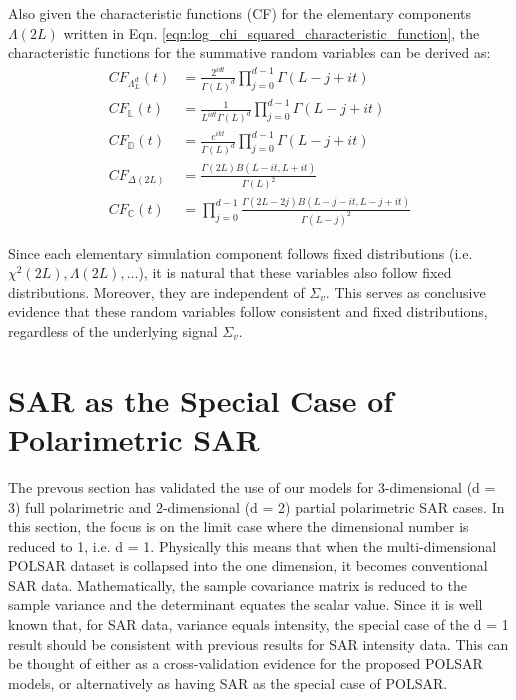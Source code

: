 Also given the characteristic functions (CF) for the elementary components $\Lambda(2L)$ written in Eqn. \ref{eqn:log_chi_squared_characteristic_function}, 
  the characteristic functions for the summative random variables can be derived as:
\begin{align}
  CF_{\Lambda^d_L}(t) &= \frac{2^{idt}}{\Gamma(L)^d} \prod^{d-1}_{j=0} \Gamma(L-j+it) \\
  CF_{\mathbb{L}}(t) &= \frac{1}{L^{idt} \Gamma(L)^d} \prod^{d-1}_{j=0} \Gamma(L-j+it) \\
  CF_{\mathbb{D}}(t) &= \frac{e^{ikt}}{\Gamma(L)^d} \prod^{d-1}_{j=0} \Gamma(L-j+it) \\
  CF_{\Delta(2L)} &= \frac{\Gamma(2L) B(L-it,L+it)}{\Gamma(L)^2} \\
  CF_{\mathbb{C}}(t) &=  \prod^{d-1}_{j=0} \frac{\Gamma(2L-2j) B(L-j-it,L-j+it)}{\Gamma(L-j)^2}
\end{align}

Since each elementary simulation component follows fixed distributions (i.e. $\chi^2(2L), \Lambda(2L), ... $),
  it is natural that these variables also follow fixed distributions.
Moreover, they are independent of $\Sigma_v$.
This serves as conclusive evidence that
  these random variables follow consistent and fixed distributions,
  regardless of the underlying signal $\Sigma_v$.

\section{SAR as the Special Case of Polarimetric SAR}
\label{sec:sar_special_case_of_polsar}

The prevous section has validated the use of our models for 3-dimensional (d = 3)
full polarimetric and 2-dimensional (d = 2) partial polarimetric SAR cases. In this
section, the focus is on the limit case where the dimensional number is reduced to 1,
i.e. d = 1. Physically this means that when the multi-dimensional POLSAR dataset is collapsed
into the one dimension, it becomes conventional  SAR data. Mathematically, the sample covariance
matrix is reduced to the sample variance and the determinant equates the scalar value.
Since  it is well known that, for SAR data, variance equals intensity,
the special case of the d = 1 result should be consistent
with previous results for SAR intensity data. This can be thought of either as a cross-validation evidence for the proposed POLSAR models, or alternatively as having SAR
as the special case of POLSAR.

